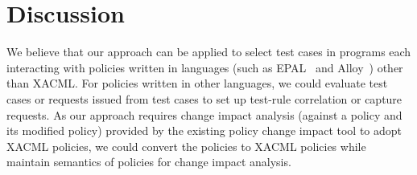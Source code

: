 \section{Discussion}\label{sec:discussion}
We believe that our approach can be applied to select
test cases in programs each interacting
with policies written in languages (such as EPAL~\cite{epal} and Alloy~\cite{jackson01:micromodularity}) other than XACML.
For policies written in other languages, we could evaluate test cases or requests issued from test cases
to set up test-rule correlation or capture requests. 
As our approach requires change impact analysis (against a policy and
its modified policy) provided by the existing policy change impact tool to adopt
XACML policies, we could convert the policies to XACML policies
while maintain semantics of policies for change impact analysis.








